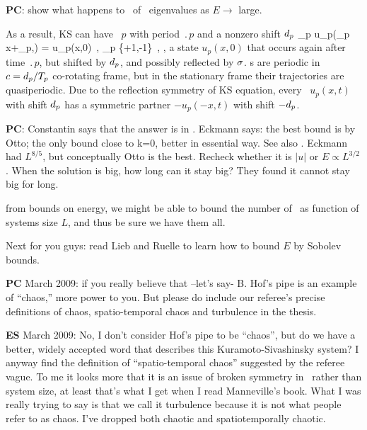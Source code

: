 {\bf PC}: show what happens to \eqva\ of \eqva\ eigenvalues
as $E \to $ large.

\bigskip

As a result, KS can have
\rpo\ $p$ with period $\period{p}$ and
a nonzero shift $d_p$
\beq
\sigma_p u_p(\sigma_p x+\shift_p,) = u_p(x,0)
\,,\qquad
\sigma_p \in \{+1,-1\}
\,,
\ie, a state $u_p(x,0)$ that occurs again after time $\period{p}$,
but shifted by $d_p$, and possibly reflected by $\sigma$.
{\Rpo s} are periodic in $c=d_p/{T_{p}}$
co-rotating frame,
but in the stationary frame their trajectories
are quasiperiodic.
Due to the reflection symmetry  of KS equation,
every \rpo\
$u_p(x,t)$ with shift $d_p$ has a symmetric partner
$-u_p(-x,t)$ with shift $-d_p$.

%
{\bf PC}:
  Constantin says that the answer is in
    . Eckmann says: the  best bound is by Otto; the
    only bound close to k=0, better in essential way. See also \refref{bronski-2005}.
    Eckmann had $L^{8/5}$, but conceptually Otto is the best. Recheck whether it is
    $|u|$ or $E \propto L^{3/2}$.
    When the solution is big, how long can it stay big? They found it cannot stay big for
    long.



from bounds on energy, we might be able
to bound the number of \eqva\ as function of systems size $L$, and thus
be sure we have them all.

Next for you guys: read Lieb and Ruelle to learn
    how to bound $E$  by Sobolev bounds.

{\bf PC} March 2009:
if you really believe that --let's say- B. Hof's pipe is an example of ``chaos,'' more
    power to you. But please do include our referee's precise definitions of
    chaos, spatio-temporal chaos and turbulence in the thesis.

{\bf ES} March 2009: No, I don't consider Hof's pipe to be ``chaos'',
		but do we have a better, widely accepted word
		that describes this Kuramoto-Sivashinsky system? I anyway
		find the definition of ``spatio-temporal chaos'' suggested
		by the referee vague. To me it looks more that it is an issue
		of broken symmetry in \KS\ rather than system size,
		at least that's what I get when I read Manneville's book.
		What I was really trying to
		say is that we call it turbulence because it is not
		what people refer to as chaos. I've dropped both chaotic
		and spatiotemporally chaotic.


